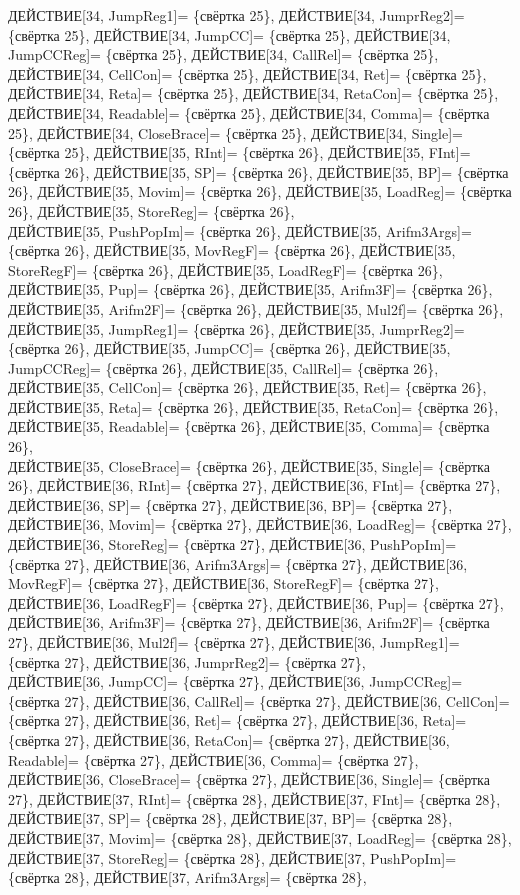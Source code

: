 \documentclass[a0]{a0poster}
\begin{document}
ДЕЙСТВИЕ[34, JumpReg1]= \{свёртка 25\}, ДЕЙСТВИЕ[34, JumprReg2]= \{свёртка 25\}, ДЕЙСТВИЕ[34, JumpCC]= \{свёртка 25\}, ДЕЙСТВИЕ[34, JumpCCReg]= \{свёртка 25\}, ДЕЙСТВИЕ[34, CallRel]= \{свёртка 25\}, ДЕЙСТВИЕ[34, CellCon]= \{свёртка 25\}, ДЕЙСТВИЕ[34, Ret]= \{свёртка 25\}, ДЕЙСТВИЕ[34, Reta]= \{свёртка 25\}, ДЕЙСТВИЕ[34, RetaCon]= \{свёртка 25\}, ДЕЙСТВИЕ[34, Readable]= \{свёртка 25\}, ДЕЙСТВИЕ[34, Comma]= \{свёртка 25\}, ДЕЙСТВИЕ[34, CloseBrace]= \{свёртка 25\}, ДЕЙСТВИЕ[34, Single]= \{свёртка 25\}, ДЕЙСТВИЕ[35, RInt]= \{свёртка 26\}, ДЕЙСТВИЕ[35, FInt]= \{свёртка 26\}, ДЕЙСТВИЕ[35, SP]= \{свёртка 26\}, ДЕЙСТВИЕ[35, BP]= \{свёртка 26\}, ДЕЙСТВИЕ[35, Movim]= \{свёртка 26\}, ДЕЙСТВИЕ[35, LoadReg]= \{свёртка 26\}, ДЕЙСТВИЕ[35, StoreReg]= \{свёртка 26\}, \\
ДЕЙСТВИЕ[35, PushPopIm]= \{свёртка 26\}, ДЕЙСТВИЕ[35, Arifm3Args]= \{свёртка 26\}, ДЕЙСТВИЕ[35, MovRegF]= \{свёртка 26\}, ДЕЙСТВИЕ[35, StoreRegF]= \{свёртка 26\}, ДЕЙСТВИЕ[35, LoadRegF]= \{свёртка 26\}, ДЕЙСТВИЕ[35, Pup]= \{свёртка 26\}, ДЕЙСТВИЕ[35, Arifm3F]= \{свёртка 26\}, ДЕЙСТВИЕ[35, Arifm2F]= \{свёртка 26\}, ДЕЙСТВИЕ[35, Mul2f]= \{свёртка 26\}, ДЕЙСТВИЕ[35, JumpReg1]= \{свёртка 26\}, ДЕЙСТВИЕ[35, JumprReg2]= \{свёртка 26\}, ДЕЙСТВИЕ[35, JumpCC]= \{свёртка 26\}, ДЕЙСТВИЕ[35, JumpCCReg]= \{свёртка 26\}, ДЕЙСТВИЕ[35, CallRel]= \{свёртка 26\}, ДЕЙСТВИЕ[35, CellCon]= \{свёртка 26\}, ДЕЙСТВИЕ[35, Ret]= \{свёртка 26\}, ДЕЙСТВИЕ[35, Reta]= \{свёртка 26\}, ДЕЙСТВИЕ[35, RetaCon]= \{свёртка 26\}, ДЕЙСТВИЕ[35, Readable]= \{свёртка 26\}, ДЕЙСТВИЕ[35, Comma]= \{свёртка 26\}, \\
ДЕЙСТВИЕ[35, CloseBrace]= \{свёртка 26\}, ДЕЙСТВИЕ[35, Single]= \{свёртка 26\}, ДЕЙСТВИЕ[36, RInt]= \{свёртка 27\}, ДЕЙСТВИЕ[36, FInt]= \{свёртка 27\}, ДЕЙСТВИЕ[36, SP]= \{свёртка 27\}, ДЕЙСТВИЕ[36, BP]= \{свёртка 27\}, ДЕЙСТВИЕ[36, Movim]= \{свёртка 27\}, ДЕЙСТВИЕ[36, LoadReg]= \{свёртка 27\}, ДЕЙСТВИЕ[36, StoreReg]= \{свёртка 27\}, ДЕЙСТВИЕ[36, PushPopIm]= \{свёртка 27\}, ДЕЙСТВИЕ[36, Arifm3Args]= \{свёртка 27\}, ДЕЙСТВИЕ[36, MovRegF]= \{свёртка 27\}, ДЕЙСТВИЕ[36, StoreRegF]= \{свёртка 27\}, ДЕЙСТВИЕ[36, LoadRegF]= \{свёртка 27\}, ДЕЙСТВИЕ[36, Pup]= \{свёртка 27\}, ДЕЙСТВИЕ[36, Arifm3F]= \{свёртка 27\}, ДЕЙСТВИЕ[36, Arifm2F]= \{свёртка 27\}, ДЕЙСТВИЕ[36, Mul2f]= \{свёртка 27\}, ДЕЙСТВИЕ[36, JumpReg1]= \{свёртка 27\}, ДЕЙСТВИЕ[36, JumprReg2]= \{свёртка 27\}, \\
ДЕЙСТВИЕ[36, JumpCC]= \{свёртка 27\}, ДЕЙСТВИЕ[36, JumpCCReg]= \{свёртка 27\}, ДЕЙСТВИЕ[36, CallRel]= \{свёртка 27\}, ДЕЙСТВИЕ[36, CellCon]= \{свёртка 27\}, ДЕЙСТВИЕ[36, Ret]= \{свёртка 27\}, ДЕЙСТВИЕ[36, Reta]= \{свёртка 27\}, ДЕЙСТВИЕ[36, RetaCon]= \{свёртка 27\}, ДЕЙСТВИЕ[36, Readable]= \{свёртка 27\}, ДЕЙСТВИЕ[36, Comma]= \{свёртка 27\}, ДЕЙСТВИЕ[36, CloseBrace]= \{свёртка 27\}, ДЕЙСТВИЕ[36, Single]= \{свёртка 27\}, ДЕЙСТВИЕ[37, RInt]= \{свёртка 28\}, ДЕЙСТВИЕ[37, FInt]= \{свёртка 28\}, ДЕЙСТВИЕ[37, SP]= \{свёртка 28\}, ДЕЙСТВИЕ[37, BP]= \{свёртка 28\}, ДЕЙСТВИЕ[37, Movim]= \{свёртка 28\}, ДЕЙСТВИЕ[37, LoadReg]= \{свёртка 28\}, ДЕЙСТВИЕ[37, StoreReg]= \{свёртка 28\}, ДЕЙСТВИЕ[37, PushPopIm]= \{свёртка 28\}, ДЕЙСТВИЕ[37, Arifm3Args]= \{свёртка 28\}, \\
\end{document}
